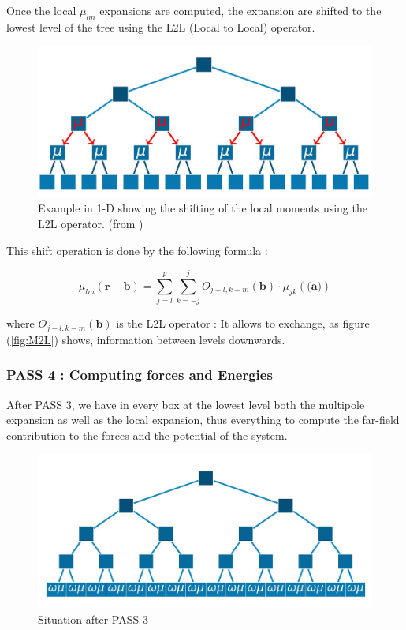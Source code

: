 \documentclass[11pt,twoside,a4paper]{report}
\begin{document}
Once the local $\mu_{lm}$ expansions are computed, the expansion are shifted to the lowest level of the tree using the L2L (Local to Local) operator.

	\begin{figure}[H]
	\label{fig:L2L}
   \includegraphics[scale=0.4]{L2L_1}
    \centering 
    \caption{Example in 1-D showing the shifting of the local moments using the L2L operator. (from \cite{phdIvo}) }
    
   \end{figure}
    
 	This shift operation is done by the following formula :
 	
 	  \begin{equation}
	  \mu_{lm}(\textbf{r} - \textbf{b}) = \sum\limits_{j = l}^{p} \sum\limits_{k=-j}^{j}
	  O_{j-l,k-m}(\textbf{b}) \cdot \mu_{jk}(\textbf{(a)})
	  \end{equation}
 
 		where $O_{j-l,k-m}(\textbf{b})$ is the L2L operator : It allows to exchange, as figure (\ref{fig:M2L}) shows, information between levels downwards.
 		
 \subsubsection{PASS 4 : Computing forces and Energies}
 
 
 After PASS 3, we have in every box at the lowest level both the multipole expansion as well as the local expansion, thus everything to compute the far-field contribution to the forces and the potential of the system. 
 
\begin{figure}[H]
	\label{fig:farfield}
   \includegraphics[scale=0.5]{farfield}
    \centering 
    \caption{Situation after PASS 3 }
    
   \end{figure} 
   
\end{document}
